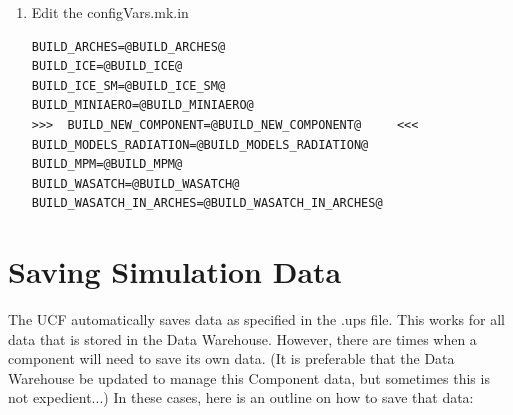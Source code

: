 \documentclass[12pt]{report}
\begin{document}
\begin{enumerate}
\item Edit the configVars.mk.in

\begin{verbatim}
BUILD_ARCHES=@BUILD_ARCHES@
BUILD_ICE=@BUILD_ICE@
BUILD_ICE_SM=@BUILD_ICE_SM@
BUILD_MINIAERO=@BUILD_MINIAERO@
>>>  BUILD_NEW_COMPONENT=@BUILD_NEW_COMPONENT@     <<<
BUILD_MODELS_RADIATION=@BUILD_MODELS_RADIATION@
BUILD_MPM=@BUILD_MPM@
BUILD_WASATCH=@BUILD_WASATCH@
BUILD_WASATCH_IN_ARCHES=@BUILD_WASATCH_IN_ARCHES@
\end{verbatim}

\end{enumerate}


\chapter{Saving Simulation Data}

The UCF automatically saves data as specified in the .ups file.  This
works for all data that is stored in the Data Warehouse.  However,
there are times when a component will need to save its own data.  (It
is preferable that the Data Warehouse be updated to manage this
Component data, but sometimes this is not expedient...)  In these
cases, here is an outline on how to save that data:
\end{document}
